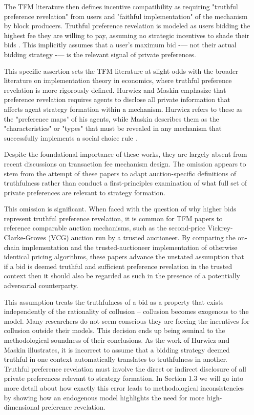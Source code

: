 \documentclass[oneside]{article}   	%
\begin{document}
The TFM literature then defines incentive compatibility as requiring "truthful preference revelation" from users and "faithful implementation" of the mechanism by block producers. Truthful preference revelation is modeled as users bidding the highest fee they are willing to pay, assuming no strategic incentives to shade their bids \cite{roughgarden2024, chung2023foundations}. This implicitly assumes that a user’s maximum bid -— not their actual bidding strategy -— is the relevant signal of private preferences.

This specific assertion sets the TFM literature at slight odds with the broader literature on implementation theory in economics, where truthful preference revelation is more rigorously defined. Hurwicz and Maskin emphasize that preference revelation requires agents to disclose all private information that affects agent strategy formation within a mechanism. Hurwicz refers to these as the "preference maps" of his agents, while Maskin describes them as the "characteristics" or "types" that must be revealed in any mechanism that successfully implements a social choice rule \cite{hurwicz1973design, hurwicz1960optimality, hurwicz2007guardians, hurwicz1979allocations, maskin1999nash, maskin2002}.

Despite the foundational importance of these works, they are largely absent from recent discussions on transaction fee mechanism design. The omission appears to stem from the attempt of these papers to adapt auction-specific definitions of truthfulness rather than conduct a first-principles examination of what full set of private preferences are relevant to strategy formation.

This omission is significant. When faced with the question of why higher bids represent truthful preference revelation, it is common for TFM papers to reference comparable auction mechanisms, such as the second-price Vickrey-Clarke-Groves (VCG) auction run by a trusted auctioneer. By comparing the on-chain implementation and the trusted-auctioneer implementation of otherwise identical pricing algorithms, these papers advance the unstated assumption that if a bid is deemed truthful and sufficient preference revelation in the trusted context then it should also be regarded as such in the presence of a potentially adversarial counterparty.

This assumption treats the truthfulness of a bid as a property that exists independently of the rationality of collusion -- collusion becomes exogenous to the model. Many researchers do not seem conscious they are forcing the incentives for collusion outside their models. This decision ends up being seminal to the methodological soundness of their conclusions. As the work of Hurwicz and Maskin illustrates, it is incorrect to assume that a bidding strategy deemed truthful in one context automatically translates to truthfulness in another. Truthful preference revelation must involve the direct or indirect disclosure of all private preferences relevant to strategy formation. In Section 1.3 we will go into more detail about how exactly this error leads to methodological inconsistencies by showing how an endogenous model highlights the need for more high-dimensional preference revelation.
\end{document}
